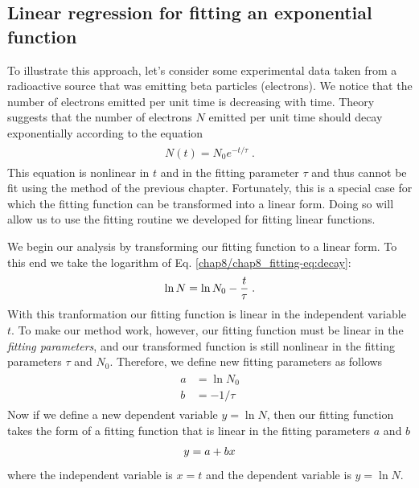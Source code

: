 \documentclass[letterpaper,10pt,english]{sphinxmanual}
\begin{document}
\subsection{Linear regression for fitting an exponential function}
\label{chap8/chap8_fitting:linear-regression-for-fitting-an-exponential-function}\label{chap8/chap8_fitting:index-1}
To illustrate this approach, let's consider some experimental data taken from a radioactive source that was emitting beta particles (electrons).  We notice that the number of electrons emitted per unit time is decreasing with time.  Theory suggests that the number of electrons \(N\) emitted per unit time should decay exponentially according to the equation
\label{chap8/chap8_fitting:equation-eq:decay}\begin{gather}
\begin{split}N(t) = N_0 e^{-t/\tau} \;.\end{split}\label{chap8/chap8_fitting-eq:decay}
\end{gather}
This equation is nonlinear in \(t\) and in the fitting parameter \(\tau\) and thus cannot be fit using the method of the previous chapter.  Fortunately, this is a special case for which the fitting function can be transformed into a linear form.  Doing so will allow us to use the fitting routine we developed for fitting linear functions.

We begin our analysis by transforming our fitting function to a linear form.  To this end we take the logarithm of Eq. \eqref{chap8/chap8_fitting-eq:decay}:
\begin{gather}
\begin{split}\ln N = \ln N_{0} -\frac{t}{\tau} \;.\end{split}\notag
\end{gather}
With this tranformation our fitting function is linear in the independent variable \(t\).  To make our method work, however, our fitting function must be linear in the \emph{fitting parameters}, and our transformed function is still nonlinear in the fitting parameters \(\tau\) and \(N_0\).  Therefore, we define new fitting parameters as follows
\label{chap8/chap8_fitting:equation-eq:eq15}\begin{gather}
\begin{split}a &= \ln N_{0}\\
b &= -1/\tau\end{split}\label{chap8/chap8_fitting-eq:eq15}
\end{gather}
Now if we define a new dependent variable \(y = \ln N\), then our fitting function takes the form of a fitting function that is linear in the fitting parameters \(a\) and \(b\)
\begin{gather}
\begin{split}y = a + bx\end{split}\notag
\end{gather}
where the independent variable is \(x=t\) and the dependent variable is \(y=\ln N\).
\end{document}
